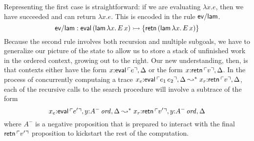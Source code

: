 Representing the first case is straightforward: if we are evaluating
$\lambda x.e$, then we have succeeded and can return $\lambda x.e$. 
This is encoded in the rule ${\sf ev/lam}$. 
\[
{\sf ev/lam} : {\sf eval}\,({\sf lam}\,\lambda x.\,E\,x)
   \rightarrowtail \{ {\sf retn}\,({\sf lam}\,\lambda x.\,E\,x) \}
\]
Because the second rule involves both recursion and multiple subgoals,
we have to generalize our picture of the state to allow us to store a
stack of unfinished work in the ordered context, growing out to the
right. Our new understanding, then, is that contexts either have the
form $x{:}{\sf eval}\,{\ulcorner{e}\urcorner}, \Delta$ or the form $x{:}{\sf
  retn}\,{\ulcorner{v}\urcorner}, \Delta$. In the process of concurrently
computaing a trace $x_e{:}{\sf eval}\,{\ulcorner{e_1\,e_2}\urcorner}, \Delta
\leadsto^* x_r{:}{\sf retn}\,{\ulcorner{v}\urcorner}, \Delta$, each of the
recursive calls to the search procedure will involve a subtrace of the
form
%
\[x_e{:}{\sf eval}\,{\ulcorner{e'}\urcorner}, y{:}{A^-}\,{{\it ord}}, \Delta
  \leadsto^*
  x_r{:}{\sf retn}\,{\ulcorner{v'}\urcorner}, y{:}{A^-}\,{{\it ord}}, \Delta\]
%
where $A^-$ is a negative proposition that is prepared to interact
with the final ${\sf retn}\,{\ulcorner{v'}\urcorner}$ proposition to kickstart the
rest of the computation.

